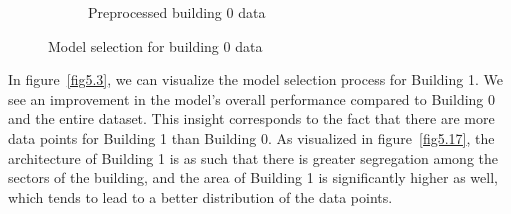 \documentclass[a4paper,singleside,12pt]{report} %
\begin{document}
\begin{figure}[!htb]
\begin{subfigure}[b]{0.48\linewidth}
			    \caption{Preprocessed building 0 data}
			  \end{subfigure}
			  \caption{Model selection for building 0 data}
			  \label{fig5.2}
			\end{figure}
			
			In figure~\ref{fig5.3}, we can visualize the model selection process for Building 1. 
			We see an improvement in the model's overall performance compared to Building 0 and the entire dataset. 
			This insight corresponds to the fact that there are more data points for Building 1 than Building 0. 
			As visualized in figure~\ref{fig5.17}, the architecture of Building 1 is as such that there is greater segregation among the sectors of the building, and the area of Building 1 is significantly higher as well, which tends to lead to a better distribution of the data points. 
			
\end{document}
